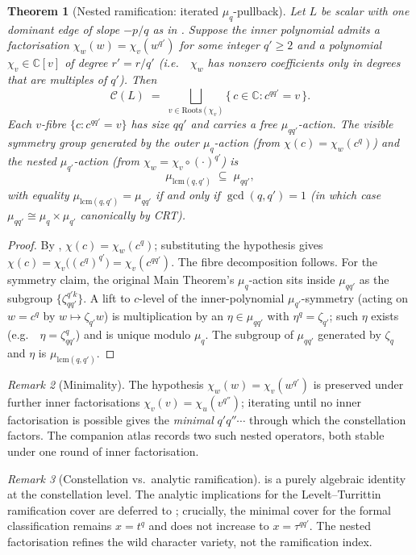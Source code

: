 \documentclass[11pt,a4paper]{article}
\theoremstyle{plain}
\newtheorem{theorem}{Theorem}[section]
\theoremstyle{definition}
\theoremstyle{remark}
\newtheorem{remark}[theorem]{Remark}
\newcommand{\Roots}{\mathrm{Roots}}
\newcommand{\Cl}{\mathcal{C}}
\newcommand{\ie}{i.e.\ }
\newcommand{\eg}{e.g.\ }
\begin{document}
\begin{theorem}[Nested ramification: iterated $\mu_q$-pullback]\label{thm:N1}
Let $L$ be scalar with one dominant edge of slope $-p/q$ as in
. Suppose the inner polynomial admits a factorisation
$\chi_w(w) = \chi_v(w^{q'})$ for some integer $q' \ge 2$ and a polynomial
$\chi_v \in \mathbb{C}[v]$ of degree $r' = r / q'$ (\ie\ $\chi_w$ has
nonzero coefficients only in degrees that are multiples of $q'$). Then
\[
   \Cl(L) \;=\; \bigsqcup_{v \in \Roots(\chi_v)}
            \big\{\, c \in \mathbb{C} : c^{qq'} = v \,\big\}.
\]
Each $v$-fibre $\{c : c^{qq'} = v\}$ has size $qq'$ and carries a free
$\mu_{qq'}$-action. The \emph{visible} symmetry group generated by the
outer $\mu_q$-action (from $\chi(c) = \chi_w(c^q)$) and the nested
$\mu_{q'}$-action (from $\chi_w = \chi_v \circ (\cdot)^{q'}$) is
\[
   \mu_{\mathrm{lcm}(q, q')} \;\subseteq\; \mu_{qq'},
\]
with equality $\mu_{\mathrm{lcm}(q, q')} = \mu_{qq'}$ if and only if
$\gcd(q, q') = 1$ (in which case $\mu_{qq'} \cong \mu_q \times \mu_{q'}$
canonically by CRT).
\end{theorem}

\begin{proof}
By , $\chi(c) = \chi_w(c^q)$; substituting the hypothesis
gives $\chi(c) = \chi_v\big((c^q)^{q'}\big) = \chi_v(c^{qq'})$. The fibre
decomposition follows. For the symmetry claim, the original Main
Theorem's $\mu_q$-action sits inside $\mu_{qq'}$ as the subgroup
$\{\zeta_{qq'}^{q' k}\}$. A lift to $c$-level of the inner-polynomial
$\mu_{q'}$-symmetry (acting on $w = c^q$ by $w \mapsto \zeta_{q'} w$) is
multiplication by an $\eta \in \mu_{qq'}$ with $\eta^q = \zeta_{q'}$;
such $\eta$ exists (\eg\ $\eta = \zeta_{qq'}^q$) and is unique modulo
$\mu_q$. The subgroup of $\mu_{qq'}$ generated by $\zeta_q$ and $\eta$
is $\mu_{\mathrm{lcm}(q, q')}$.
\end{proof}

\begin{remark}[Minimality]\label{rem:N1-min}
The hypothesis $\chi_w(w) = \chi_v(w^{q'})$ is preserved under further
inner factorisations $\chi_v(v) = \chi_u(v^{q''})$; iterating until no
inner factorisation is possible gives the \emph{minimal} $q' q'' \cdots$
through which the constellation factors. The companion atlas
\cite{wkb_dataset_v1} records two such nested operators, both stable
under one round of inner factorisation.
\end{remark}

\begin{remark}[Constellation vs.\ analytic ramification]\label{rem:N1-analytic}
 is a purely algebraic identity at the constellation level.
The analytic implications for the Levelt--Turrittin ramification cover are
deferred to ; crucially, the minimal cover for the formal
classification remains $x = t^q$ and does not increase to $x = \tau^{qq'}$.
The nested factorisation refines the wild character variety, not the
ramification index.
\end{remark}
\end{document}

